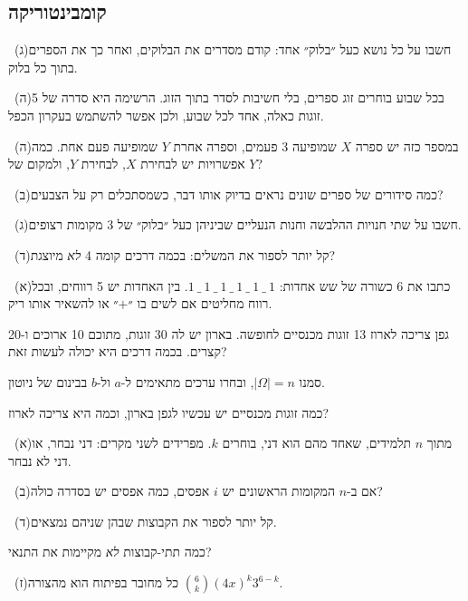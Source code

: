 \documentclass[12pt, a4paper]{article}
\begin{document}
\subsection*{קומבינטוריקה}
\noindent {}\ (ג)\enskip חשבו על כל נושא כעל ״בלוק״ אחד: קודם מסדרים את הבלוקים, ואחר כך את הספרים בתוך כל בלוק.\par\smallskip
\noindent {}\ (ה)\enskip בכל שבוע בוחרים זוג ספרים, בלי חשיבות לסדר בתוך הזוג. הרשימה היא סדרה של 5 זוגות כאלה, אחד לכל שבוע, ולכן אפשר להשתמש בעקרון הכפל.\par\smallskip
\noindent {}\ (ה)\enskip במספר כזה יש ספרה $X$ שמופיעה 3 פעמים, וספרה אחרת $Y$ שמופיעה פעם אחת. כמה אפשרויות יש לבחירת $X$, לבחירת $Y$, ולמקום של $Y$?\par\smallskip
\noindent {}\ (ב)\enskip כמה סידורים של ספרים שונים נראים בדיוק אותו דבר, כשמסתכלים רק על הצבעים?\par\smallskip
\noindent {}\ (ג)\enskip חשבו על שתי חנויות ההלבשה וחנות הנעליים שביניהן כעל ״בלוק״ של 3 מקומות רצופים.\par\smallskip
\noindent {}\ (ד)\enskip קל יותר לספור את המשלים: בכמה דרכים קומה 4 \emph{לא} מיוצגת?\par\smallskip
\noindent {}\ (א)\enskip כתבו את 6 כשורה של שש אחדות: $1\ \_\ 1\ \_\ 1\ \_\ 1\ \_\ 1\ \_\ 1$. בין האחדות יש 5 רווחים, ובכל רווח מחליטים אם לשים בו ״$+$״ או להשאיר אותו ריק.\par\smallskip
\noindent {}\enskip גפן צריכה לארוז 13 זוגות מכנסיים לחופשה. בארון יש לה 30 זוגות, מתוכם 10 ארוכים ו-20 קצרים. בכמה דרכים היא יכולה לעשות זאת?\par\smallskip
\noindent {}\enskip סמנו $|\Omega|=n$, ובחרו ערכים מתאימים ל-$a$ ול-$b$ בבינום של ניוטון.\par\smallskip
\noindent {}\enskip כמה זוגות מכנסיים יש עכשיו לגפן בארון, וכמה היא צריכה לארוז?\par\smallskip
\noindent {}\ (א)\enskip מתוך $n$ תלמידים, שאחד מהם הוא דני, בוחרים $k$. מפרידים לשני מקרים: דני נבחר, או דני לא נבחר.\par\smallskip
\noindent {}\ (ב)\enskip אם ב-$n$ המקומות הראשונים יש $i$ אפסים, כמה אפסים יש בסדרה כולה?\par\smallskip
\noindent {}\ (ד)\enskip קל יותר לספור את הקבוצות שבהן שניהם נמצאים.\par\smallskip
\noindent {}\enskip כמה תתי-קבוצות \emph{לא} מקיימות את התנאי?\par\smallskip
\noindent {}\ (ז)\enskip כל מחובר בפיתוח הוא מהצורה $\binom6k(4x)^k3^{6-k}$.\par\smallskip
\end{document}
